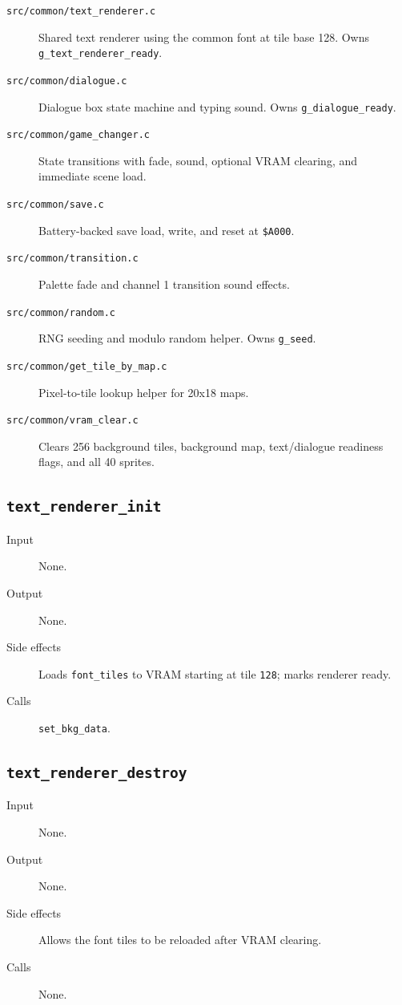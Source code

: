 \begin{description}
  \item[\texttt{src/common/text\_renderer.c}] Shared text renderer using the common font at tile base 128. Owns \texttt{g\_text\_renderer\_ready}.
  \item[\texttt{src/common/dialogue.c}] Dialogue box state machine and typing sound. Owns \texttt{g\_dialogue\_ready}.
  \item[\texttt{src/common/game\_changer.c}] State transitions with fade, sound, optional VRAM clearing, and immediate scene load.
  \item[\texttt{src/common/save.c}] Battery-backed save load, write, and reset at \texttt{\$A000}.
  \item[\texttt{src/common/transition.c}] Palette fade and channel 1 transition sound effects.
  \item[\texttt{src/common/random.c}] RNG seeding and modulo random helper. Owns \texttt{g\_seed}.
  \item[\texttt{src/common/get\_tile\_by\_map.c}] Pixel-to-tile lookup helper for 20x18 maps.
  \item[\texttt{src/common/vram\_clear.c}] Clears 256 background tiles, background map, text/dialogue readiness flags, and all 40 sprites.
\end{description}

\subsection*{\texttt{text\_renderer\_init}}
\begin{description}
  \item[Input] None.
  \item[Output] None.
  \item[Side effects] Loads \texttt{font\_tiles} to VRAM starting at tile \texttt{128}; marks renderer ready.
  \item[Calls] \texttt{set\_bkg\_data}.
\end{description}

\subsection*{\texttt{text\_renderer\_destroy}}
\begin{description}
  \item[Input] None.
  \item[Output] None.
  \item[Side effects] Allows the font tiles to be reloaded after VRAM clearing.
  \item[Calls] None.
\end{description}

